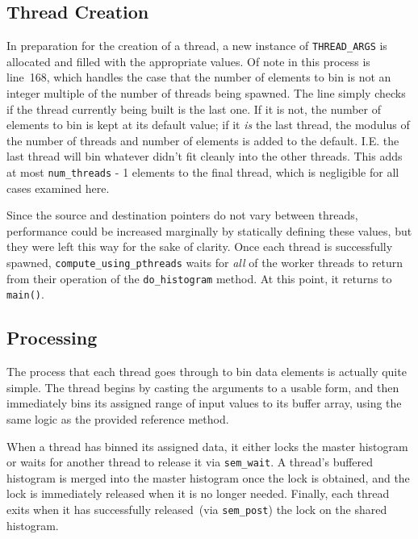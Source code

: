 \documentclass{article}
\newcommand{\lst}[2]{
	\begin{center}
	\parbox{.6\textwidth}{
	}
	\end{center}
}
\newcommand{\ttt}[1]{\texttt{#1}}
\begin{document}
\subsection{Thread Creation}
In preparation for the creation of a thread, a new instance of
\ttt{THREAD\_ARGS} is allocated and filled with the appropriate values.  Of
note in this process is line~168, which handles the case that the number of
elements to bin is not an integer multiple of the number of threads being
spawned.  The line simply checks if the thread currently being built is the
last one.  If it is not, the number of elements to bin is kept at its default
value; if it \emph{is} the last thread, the modulus of the number of threads
and number of elements is added to the default.  I.E. the last thread will bin
whatever didn't fit cleanly into the other threads.  This adds at most
\ttt{num\_threads} - 1 elements to the final thread, which is negligible for all
cases examined here.
%
\lst{157}{185}
%
Since the source and destination pointers do not vary between threads,
performance could be increased marginally by statically defining these values,
but they were left this way for the sake of clarity.  Once each thread is
successfully spawned, \ttt{compute\_using\_pthreads} waits for \emph{all} of
the worker threads to return from their operation of the \ttt{do\_histogram}
method.  At this point, it returns to \ttt{main()}.

\subsection{Processing}
The process that each thread goes through to bin data elements is actually
quite simple.  The thread begins by casting the arguments to a usable form, and
then immediately bins its assigned range of input values to its buffer array,
using the same logic as the provided reference method.
%
\lst{187}{206}
%
When a thread has binned its assigned data, it either locks the master
histogram or waits for another thread to release it via \ttt{sem\_wait}.  A
thread's buffered histogram is merged into the master histogram once the lock
is obtained, and the lock is immediately released when it is no longer needed.
Finally, each thread exits when it has successfully released~(via
\ttt{sem\_post}) the lock on the shared histogram.
\end{document}
